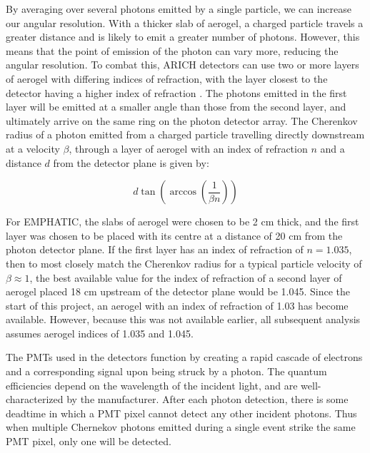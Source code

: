 By averaging over several photons emitted by a single particle, we can increase our angular resolution.
With a thicker slab of aerogel, a charged particle travels a greater distance and is likely to emit a greater number of photons.
However, this means that the point of emission of the photon can vary more, reducing the angular resolution.
To combat this, \ac{ARICH} detectors can use two or more layers of aerogel with differing indices of refraction, with the layer closest to the detector having a higher index of refraction \cite{belleArich}.
The photons emitted in the first layer will be emitted at a smaller angle than those from the second layer, and ultimately arrive on the same ring on the photon detector array.
The Cherenkov radius of a photon emitted from a charged particle travelling directly downstream at a velocity $\beta$, through a layer of aerogel with an index of refraction $n$ and a distance $d$ from the detector plane is given by:

\begin{equation}
d\tan\left(\arccos\left(\frac{1}{\beta n}\right)\right)
\end{equation}

For EMPHATIC, the slabs of aerogel were chosen to be 2 cm thick, and the first layer was chosen to be placed with its centre at a distance of 20 cm from the photon detector plane.
If the first layer has an index of refraction of $n = 1.035$, then to most closely match the Cherenkov radius for a typical particle velocity of $\beta \approx 1$, the best available value for the index of refraction of a second layer of aerogel placed 18 cm upstream of the detector plane would be 1.045. 
Since the start of this project, an aerogel with an index of refraction of 1.03 has become available.
However, because this was not available earlier, all subsequent analysis assumes aerogel indices of 1.035 and 1.045.

The \ac{PMT}s used in the detectors function by creating a rapid cascade of electrons and a corresponding signal upon being struck by a photon.
The quantum efficiencies depend on the wavelength of the incident light, and are well-characterized by the manufacturer.
After each photon detection, there is some deadtime in which a PMT pixel cannot detect any other incident photons.
Thus when multiple Chernekov photons emitted during a single event strike the same PMT pixel, only one will be detected.

